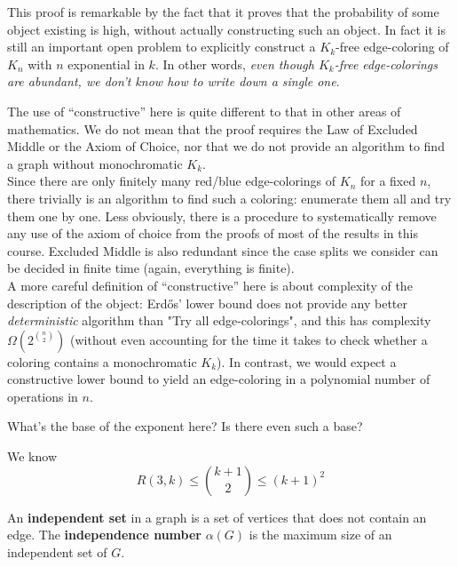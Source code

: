 \documentclass{article}
\begin{document}
This proof is remarkable by the fact that it proves that the probability of some object existing is high, without actually constructing such an object. In fact it is still an important open problem to explicitly construct a $K_k$-free edge-coloring of $K_n$ with $n$ exponential in $k$. In other words, {\it even though $K_k$-free edge-colorings are abundant, we don't know how to write down a single one}.

\begin{rmk}
  The use of ``constructive'' here is quite different to that in other areas of mathematics. We do not mean that the proof requires the Law of Excluded Middle or the Axiom of Choice, nor that we do not provide an algorithm to find a graph without monochromatic $K_k$. \\
  Since there are only finitely many red/blue edge-colorings of $K_n$ for a fixed $n$, there trivially is an algorithm to find such a coloring: enumerate them all and try them one by one. Less obviously, there is a procedure to systematically remove any use of the axiom of choice from the proofs of most of the results in this course. Excluded Middle is also redundant since the case splits we consider can be decided in finite time (again, everything is finite). \\
  A more careful definition of ``constructive'' here is about complexity of the description of the object: Erd\H os' lower bound does not provide any better {\it deterministic} algorithm than "Try all edge-colorings", and this has complexity $\Omega\left(2^{\binom n 2}\right)$ (without even accounting for the time it takes to check whether a coloring contains a monochromatic $K_k$). In contrast, we would expect a constructive lower bound to yield an edge-coloring in a polynomial number of operations in $n$.
\end{rmk}

\begin{question}
  What's the base of the exponent here? Is there even such a base?
\end{question}

\newlec

We know
$$R(3, k) \le \binom{k + 1}2 \le (k + 1)^2$$

\begin{defi}
  An {\bf independent set} in a graph is a set of vertices that does not contain an edge. The {\bf independence number} $\alpha(G)$ is the maximum size of an independent set of $G$.
\end{defi}
\end{document}
